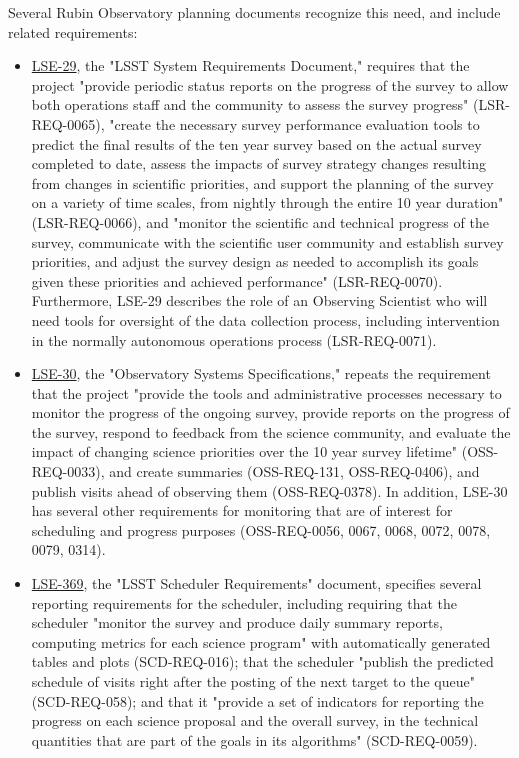 Several Rubin Observatory planning documents recognize this need, and include related requirements:
\begin{itemize}
\item \href{https://ls.st/lse-29}{LSE-29}, the "LSST System Requirements Document," requires that the project "provide periodic status reports on the progress of the survey to allow both operations staff and the community to assess the survey progress" (LSR-REQ-0065), "create the necessary survey performance evaluation tools to predict the final results of the ten year survey based on the actual survey completed to date, assess the impacts of survey strategy changes resulting from changes in scientific priorities, and support the planning of the survey on a variety of time scales, from nightly through the entire 10 year duration" (LSR-REQ-0066), and "monitor the scientific and technical progress of the survey, communicate with the scientific user community and establish survey priorities, and adjust the survey design as needed to accomplish its goals given these priorities and achieved performance" (LSR-REQ-0070). Furthermore, LSE-29 describes the role of an Observing Scientist who will need tools for oversight of the data collection process, including intervention in the normally autonomous operations process (LSR-REQ-0071).
\item \href{https://ls.st/lse-30}{LSE-30}, the "Observatory Systems Specifications," repeats the requirement that the project "provide the tools and administrative processes necessary to monitor the progress of the ongoing survey, provide reports on the progress of the survey, respond to feedback from the science community, and evaluate the impact of changing science priorities over the 10 year survey lifetime" (OSS-REQ-0033), and create summaries (OSS-REQ-131, OSS-REQ-0406), and publish visits ahead of observing them (OSS-REQ-0378). In addition, LSE-30 has several other requirements for monitoring that are of interest for scheduling and progress purposes (OSS-REQ-0056, 0067, 0068, 0072, 0078, 0079, 0314).
\item \href{https://ls.st/lse-369}{LSE-369}, the "LSST Scheduler Requirements" document, specifies several reporting requirements for the scheduler, including requiring that the scheduler "monitor the survey and produce daily summary reports, computing metrics for each science program" with automatically generated tables and plots (SCD-REQ-016); that the scheduler "publish the predicted schedule of visits right after the posting of the next target to the queue" (SCD-REQ-058); and that it "provide a set of indicators for reporting the progress on each science proposal and the overall survey, in the technical quantities that are part of the goals in its algorithms" (SCD-REQ-0059).

\end{itemize}
